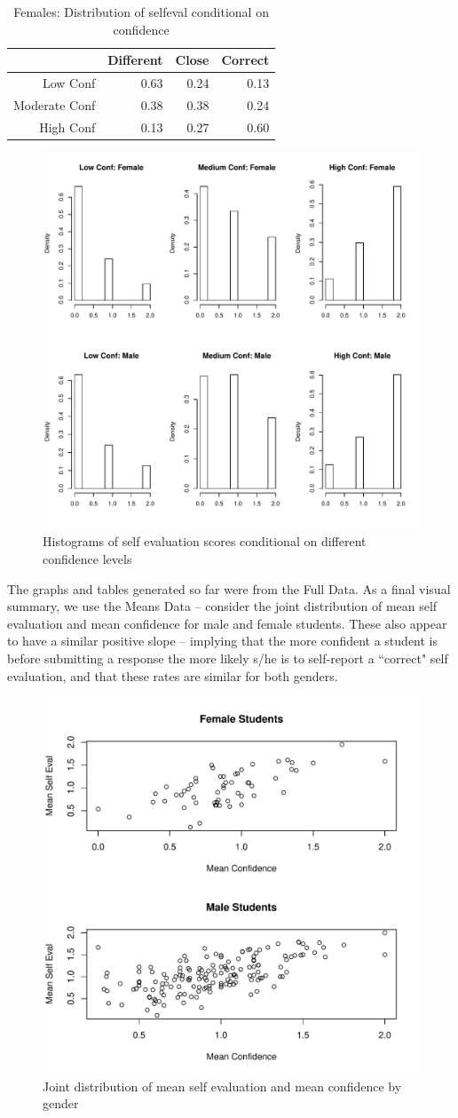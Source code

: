 \documentclass[11pt]{article} %
\begin{document}
\begin{table}[H]\small
\centering 
\caption{Females: Distribution of selfeval conditional on confidence}
\begin{tabular}{rrrr}
  \hline
 & Different & Close & Correct \\ 
  \hline
Low Conf & 0.63 & 0.24 & 0.13 \\ 
  Moderate Conf & 0.38 & 0.38 & 0.24 \\ 
  High Conf & 0.13 & 0.27 & 0.60 \\ 
   \hline
\end{tabular}
\end{table}



\begin{figure}[H]
\centering
\caption{Histograms of self evaluation scores conditional on different confidence levels }
\includegraphics[width = 0.55 \textwidth]{comparison3.pdf}
\end{figure}
\noindent
The graphs and tables generated so far were from the Full Data. As a final visual summary, we use the Means Data --  consider the joint distribution of mean self evaluation and mean confidence for male and female students. These also appear to have a similar positive slope -- implying that the more confident a student is before submitting a response the more likely s/he is to self-report a ``correct" self evaluation, and that these rates are similar for both genders. 

\begin{figure}[H]
\caption{Joint distribution of mean self evaluation and mean confidence by gender }
\centering
\includegraphics[width = 0.5 \textwidth]{comparison4.pdf}
\end{figure}
\end{document}
